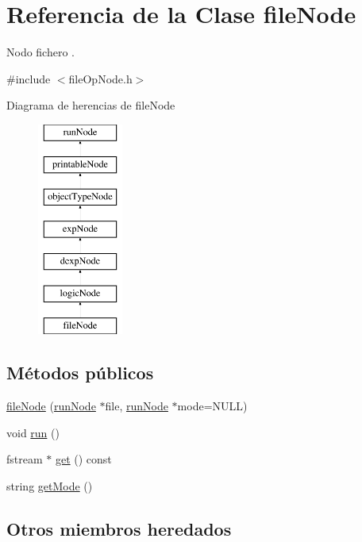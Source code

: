 \hypertarget{classfileNode}{\section{Referencia de la Clase file\-Node}
\label{classfileNode}
}


Nodo fichero .  




{\ttfamily \#include $<$file\-Op\-Node.\-h$>$}

Diagrama de herencias de file\-Node\begin{figure}[H]
\begin{center}
\leavevmode
\includegraphics[height=7.000000cm]{classfileNode}
\end{center}
\end{figure}
\subsection*{Métodos públicos}
\begin{DoxyCompactItemize}
\item 
\hyperlink{classfileNode_a2d9014c5f0902bd415b41a6519056c4b}{file\-Node} (\hyperlink{classrunNode}{run\-Node} $\ast$file, \hyperlink{classrunNode}{run\-Node} $\ast$mode=N\-U\-L\-L)
\item 
void \hyperlink{classfileNode_a54a9c6df980993a5de838839f4fc54f3}{run} ()
\item 
fstream $\ast$ \hyperlink{classfileNode_a46be9af6a79c1956c0e07444c2ec713e}{get} () const 
\item 
string \hyperlink{classfileNode_a6b5786f432ddab8daf3c90deb24413c9}{get\-Mode} ()
\end{DoxyCompactItemize}
\subsection*{Otros miembros heredados}


